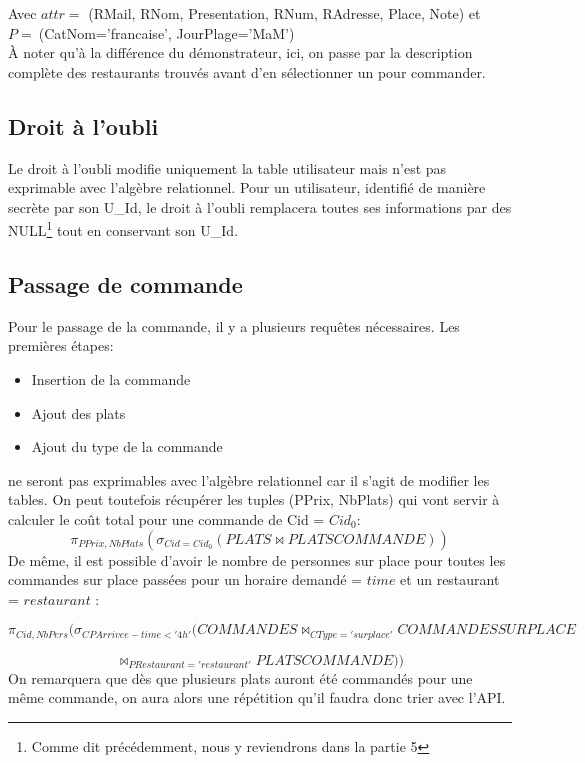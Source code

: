 \documentclass[10pt, a4paper]{article}
\begin{document}
Avec \(attr = \) (RMail, RNom, Presentation, RNum, RAdresse, Place, Note) et \\ \(P =\ \)(CatNom='francaise', JourPlage='MaM')
\\

À noter qu'à la différence du démonstrateur, ici, on passe par la description complète des restaurants trouvés avant d'en sélectionner un pour commander.

\subsection{Droit à l'oubli}
Le droit à l'oubli modifie uniquement la table utilisateur mais n'est pas exprimable
avec l'algèbre relationnel. Pour un utilisateur, identifié de manière secrète par son U\_Id, le droit à l'oubli remplacera toutes ses informations par des NULL\footnote[1]{Comme dit précédemment, nous y reviendrons dans la partie 5} tout en conservant son U\_Id.

\subsection{Passage de commande}
Pour le passage de la commande, il y a plusieurs requêtes nécessaires.
Les premières étapes:
\begin{itemize}
    \item Insertion de la commande
    \item Ajout des plats
    \item Ajout du type de la commande
\end{itemize}
ne seront pas exprimables avec l'algèbre relationnel car il s'agit de modifier les tables.
On peut toutefois récupérer les tuples (PPrix, NbPlats) qui vont servir à calculer le coût total pour une commande de Cid = $Cid_0$:
$$
    \pi_{PPrix, NbPlats}( \sigma_{Cid = Cid_0}(PLATS \Join PLATSCOMMANDE))
$$
De même, il est possible d'avoir le nombre de personnes sur place pour toutes les commandes sur place passées pour un horaire demandé = $time$ et un restaurant = $restaurant$ :

$$
    \pi_{Cid, NbPers}(\sigma_{CPArrivee - time < '4h'}(COMMANDES \Join_{CType = 'sur place'} COMMANDESSURPLACE
    $$

    $$
    \Join_{PRestaurant = 'restaurant'} PLATSCOMMANDE))
$$
On remarquera que dès que plusieurs plats auront été commandés pour une même commande, on aura alors
une répétition qu'il faudra donc trier avec l'API.

\newpage
\end{document}

